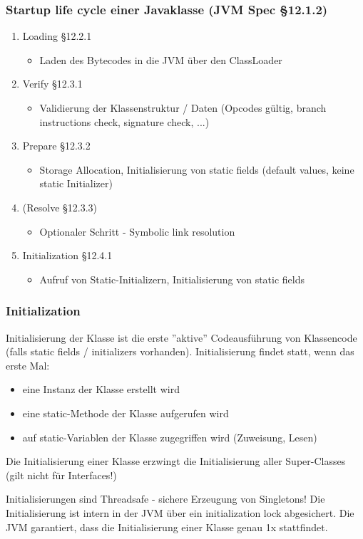 \documentclass[aspectratio=169]{beamer}
\begin{document}
\begin{frame}
	\frametitle{Startup life cycle einer Javaklasse (JVM Spec §12.1.2)}
	\begin{enumerate}
		\item{Loading §12.2.1}
			\begin{itemize}
				\item{Laden des Bytecodes in die JVM über den ClassLoader}
			\end{itemize}
		\item{Verify §12.3.1}
			\begin{itemize}
				\item{Validierung der Klassenstruktur / Daten (Opcodes gültig, branch instructions check, signature check, ...)}
			\end{itemize}
		\item{Prepare §12.3.2}
			\begin{itemize}
				\item{Storage Allocation, Initialisierung von static fields (default values, keine static Initializer)}
			\end{itemize}
		\item{(Resolve §12.3.3)}
			\begin{itemize}
				\item{Optionaler Schritt - Symbolic link resolution}
			\end{itemize}
		\item{Initialization §12.4.1}
			\begin{itemize}
				\item{Aufruf von Static-Initializern, Initialisierung von static fields}
			\end{itemize}
	\end{enumerate}
\end{frame}

\begin{frame}
	\frametitle{Initialization}
	Initialisierung der Klasse ist die erste ''aktive'' Codeausführung von Klassencode (falls static fields / initializers vorhanden). Initialisierung findet statt, wenn das erste Mal:
	\begin{itemize}
		\item{eine Instanz der Klasse erstellt wird}
		\item{eine static-Methode der Klasse aufgerufen wird}
		\item{auf static-Variablen der Klasse zugegriffen wird (Zuweisung, Lesen)}
	\end{itemize}

	Die Initialisierung einer Klasse erzwingt die Initialisierung aller Super-Classes (gilt nicht für Interfaces!)
	\pause
	\begin{block}{Initialisierungen sind Threadsafe - sichere Erzeugung von Singletons!}
		Die Initialisierung ist intern in der JVM über ein initialization lock abgesichert. Die JVM garantiert, dass die Initialisierung einer Klasse genau 1x stattfindet. 
	\end{block}
\end{frame}
\end{document}
